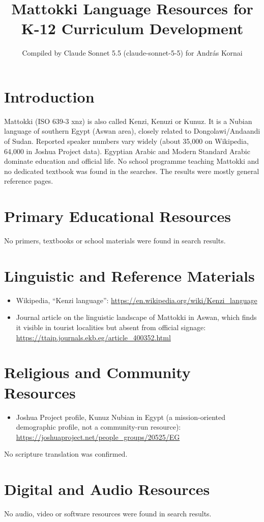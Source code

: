 \documentclass[12pt]{article}
\title{Mattokki Language Resources for K-12 Curriculum Development}
\author{Compiled by Claude Sonnet 5.5 (claude-sonnet-5-5) for Andr\'as Kornai}
\date{}
\begin{document}
\maketitle

\section{Introduction}
Mattokki (ISO 639-3 xnz) is also called Kenzi, Kenuzi or Kunuz. It is a Nubian language of southern Egypt (Aswan area), closely related to Dongolawi/Andaandi of Sudan. Reported speaker numbers vary widely (about 35,000 on Wikipedia, 64,000 in Joshua Project data). Egyptian Arabic and Modern Standard Arabic dominate education and official life. No school programme teaching Mattokki and no dedicated textbook was found in the searches. The results were mostly general reference pages.

\section{Primary Educational Resources}
No primers, textbooks or school materials were found in search results.

\section{Linguistic and Reference Materials}
\begin{itemize}
\item Wikipedia, ``Kenzi language'': \url{https://en.wikipedia.org/wiki/Kenzi_language}
\item Journal article on the linguistic landscape of Mattokki in Aswan, which finds it visible in tourist localities but absent from official signage: \url{https://ttaip.journals.ekb.eg/article_400352.html}
\end{itemize}

\section{Religious and Community Resources}
\begin{itemize}
\item Joshua Project profile, Kunuz Nubian in Egypt (a mission-oriented demographic profile, not a community-run resource): \url{https://joshuaproject.net/people_groups/20525/EG}
\end{itemize}
No scripture translation was confirmed.

\section{Digital and Audio Resources}
No audio, video or software resources were found in search results.
\end{document}
